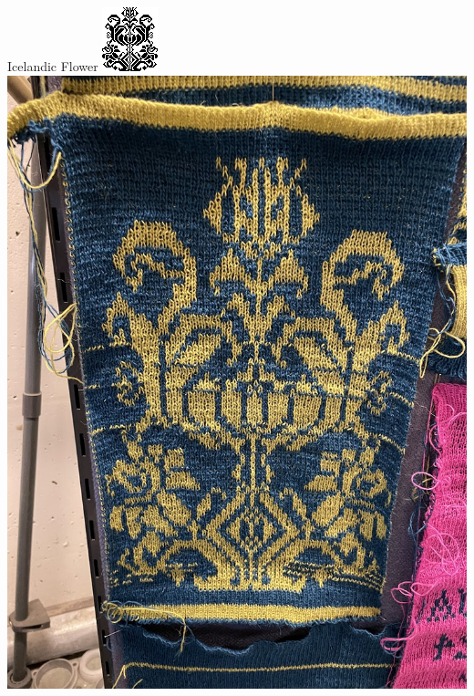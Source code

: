 \documentclass[
    NAME={Dr. Helga Ingimundardóttir},
    EMAIL={helgaingim@hi.is},
    FACULTY={Industrial Engineering},
    TITLE={HiDef Textiles: Reviving Tradition with Innovation},
    SUBTITLE={Empowering Creativity and Sustainability in Textile Production through Digital Transformation},
    SEMINAR={Reykjavík DataBeers},
    DATE={January 25, 2025},
    WIDE={true}
]{HI-LaTeX/hi-beamer}
\begin{document}
\begin{frame}{Icelandic Flower}
\centering
    \includegraphics[height=.7\textheight]{include/thjms5898_210.png}
    \hspace{24pt}
    \includegraphics[height=.7\textheight]{include/flower.jpg}
\end{frame}
\end{document}
